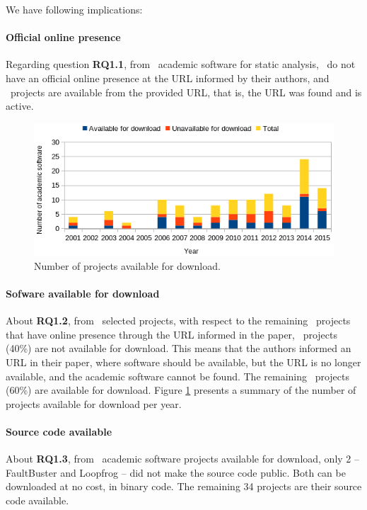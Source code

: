 %
We have following implications:

\paragraph{\bf Official online presence}
Regarding question \textbf{RQ1.1}, from \SoftwareCount \ academic software
for static analysis, \SoftwareUrlNotAvailableCount \ do not have an official
online presence at the URL informed by their authors, and
\SoftwareUrlAvailableCount \ projects are available from the provided URL, that
is, the URL was found and is active.

\begin{figure}[ht]
  \center
  \includegraphics[scale=0.6]{figs/software-available-by-year.png}
  \caption{Number of projects available for download.}
  \label{software-available-by-year}
\end{figure}

\paragraph{\bf Sofware available for download}
About \textbf{RQ1.2}, from  \SoftwareCount \ selected projects,
with respect to the remaining \SoftwareUrlAvailableCount \ projects
that have online presence through the URL informed in the paper,
\SoftwareDownloadNotAvailableCount \ projects (40\%) are not available for
download.
This means that the authors informed an URL in
their paper, where software should be available,
but the URL is no longer available,
and the academic software cannot be found.
%
The remaining \SoftwareDownloadAvailableCount \ projects (60\%) are
available for download. Figure \ref{software-available-by-year} presents a summary of the
number of projects available for download per year.

\paragraph{\bf Source code available}
About \textbf{RQ1.3},
from \SoftwareDownloadAvailableCount \
academic software projects available for download,  only 2 -- FaultBuster
and Loopfrog -- did not make the source code
public. Both can be downloaded at no cost, in binary code. The remaining 34
projects are their source code available.

